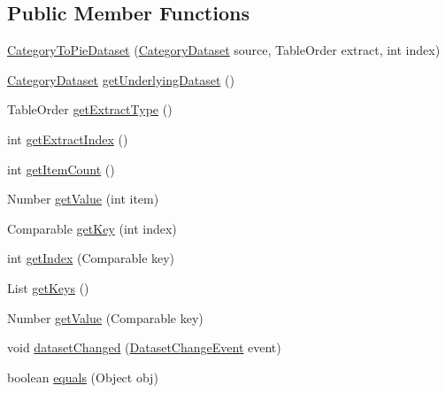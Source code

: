 \subsection*{Public Member Functions}
\begin{DoxyCompactItemize}
\item 
\mbox{\hyperlink{classorg_1_1jfree_1_1data_1_1category_1_1_category_to_pie_dataset_a19579fe08f99baab3999534e9a13022d}{Category\+To\+Pie\+Dataset}} (\mbox{\hyperlink{interfaceorg_1_1jfree_1_1data_1_1category_1_1_category_dataset}{Category\+Dataset}} source, Table\+Order extract, int index)
\item 
\mbox{\hyperlink{interfaceorg_1_1jfree_1_1data_1_1category_1_1_category_dataset}{Category\+Dataset}} \mbox{\hyperlink{classorg_1_1jfree_1_1data_1_1category_1_1_category_to_pie_dataset_abdb68ef3a107a1acaacf56e9b316e30b}{get\+Underlying\+Dataset}} ()
\item 
Table\+Order \mbox{\hyperlink{classorg_1_1jfree_1_1data_1_1category_1_1_category_to_pie_dataset_a28a869dfdc0e7d844810da4a305063c7}{get\+Extract\+Type}} ()
\item 
int \mbox{\hyperlink{classorg_1_1jfree_1_1data_1_1category_1_1_category_to_pie_dataset_a2ab6df133bee9435ab2a0dbc7a2fb7ef}{get\+Extract\+Index}} ()
\item 
int \mbox{\hyperlink{classorg_1_1jfree_1_1data_1_1category_1_1_category_to_pie_dataset_a7536f863e26d692f65131df0ed9150c3}{get\+Item\+Count}} ()
\item 
Number \mbox{\hyperlink{classorg_1_1jfree_1_1data_1_1category_1_1_category_to_pie_dataset_a994ec52d8053b1ac0604dae5495fff5f}{get\+Value}} (int item)
\item 
Comparable \mbox{\hyperlink{classorg_1_1jfree_1_1data_1_1category_1_1_category_to_pie_dataset_a5e57f6d91a01781de16ac109e3933d1d}{get\+Key}} (int index)
\item 
int \mbox{\hyperlink{classorg_1_1jfree_1_1data_1_1category_1_1_category_to_pie_dataset_a7a409f1cbb1cc8430652216156e3b7af}{get\+Index}} (Comparable key)
\item 
List \mbox{\hyperlink{classorg_1_1jfree_1_1data_1_1category_1_1_category_to_pie_dataset_aa8974b76f827b4dc093f0d6b66752c1c}{get\+Keys}} ()
\item 
Number \mbox{\hyperlink{classorg_1_1jfree_1_1data_1_1category_1_1_category_to_pie_dataset_a1252b049b706dac0ec3c3788bb25d1bf}{get\+Value}} (Comparable key)
\item 
void \mbox{\hyperlink{classorg_1_1jfree_1_1data_1_1category_1_1_category_to_pie_dataset_a4c793a0222730fcb45a6c05279342269}{dataset\+Changed}} (\mbox{\hyperlink{classorg_1_1jfree_1_1data_1_1general_1_1_dataset_change_event}{Dataset\+Change\+Event}} event)
\item 
boolean \mbox{\hyperlink{classorg_1_1jfree_1_1data_1_1category_1_1_category_to_pie_dataset_a711b20a5a1fd63c4f1aeb08f852f0ccf}{equals}} (Object obj)
\end{DoxyCompactItemize}
